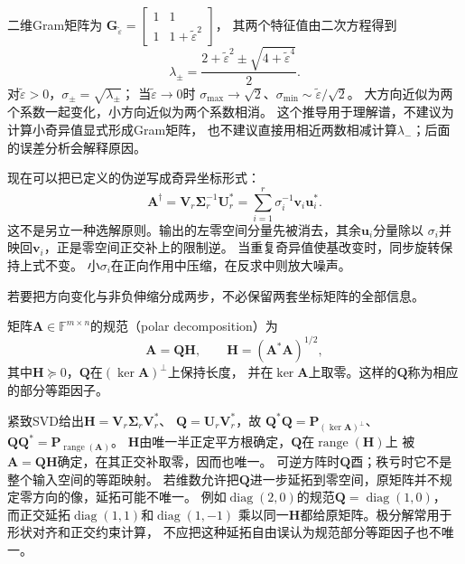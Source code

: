 二维Gram矩阵为
$\bm G_{\widetilde\varepsilon}
=\left[\begin{smallmatrix}1&1\\1&1+\widetilde\varepsilon^2\end{smallmatrix}\right]$，
其两个特征值由二次方程得到
\begin{equation}
 \lambda_\pm
 =\frac{2+\widetilde\varepsilon^2
          \mathbin{\pm}\sqrt{4+\widetilde\varepsilon^4}}{2}.
 \label{eq:matrix-analysis-nearly-collinear-gram-eigenvalues}
\end{equation}
对$\widetilde\varepsilon>0$，$\sigma_\pm=\sqrt{\lambda_\pm}$；
当$\widetilde\varepsilon\to0$时
$\sigma_{\max}\to\sqrt2$、$\sigma_{\min}\sim\widetilde\varepsilon/\sqrt2$。
大方向近似为两个系数一起变化，小方向近似为两个系数相消。
这个推导用于理解谱，不建议为计算小奇异值显式形成Gram矩阵，
也不建议直接用相近两数相减计算$\lambda_-$；后面的误差分析会解释原因。

现在可以把已定义的伪逆写成奇异坐标形式：
\begin{equation}
 \bm A^\dagger
 =\bm V_r\bm\Sigma_r^{-1}\bm U_r^*
 =\sum_{i=1}^r\sigma_i^{-1}\bm v_i\bm u_i^*.
 \label{eq:matrix-analysis-pseudoinverse}
\end{equation}
这不是另立一种选解原则。输出的左零空间分量先被消去，其余$\bm u_i$分量除以
$\sigma_i$并映回$\bm v_i$，正是零空间正交补上的限制逆。
当重复奇异值使基改变时，同步旋转保持上式不变。
小$\sigma_i$在正向作用中压缩，在反求中则放大噪声。

若要把方向变化与非负伸缩分成两步，不必保留两套坐标矩阵的全部信息。
\begin{definition}[极分解与部分等距因子]
\label{def:matrix-analysis-polar-decomposition}
矩阵$\bm A\in\mathbb F^{m\times n}$的规范（polar decomposition）为
\begin{equation}
 \bm A=\bm Q\bm H,\qquad
 \bm H=(\bm A^*\bm A)^{1/2},
 \label{eq:matrix-analysis-polar-decomposition}
\end{equation}
其中$\bm H\succeq0$，$\bm Q$在$(\ker\bm A)^\perp$上保持长度，
并在$\ker\bm A$上取零。这样的$\bm Q$称为相应的部分等距因子。
\end{definition}
紧致SVD给出$\bm H=\bm V_r\bm\Sigma_r\bm V_r^*$、
$\bm Q=\bm U_r\bm V_r^*$，故
$\bm Q^*\bm Q=\bm P_{(\ker\bm A)^\perp}$、
$\bm Q\bm Q^*=\bm P_{\operatorname{range}(\bm A)}$。
$\bm H$由唯一半正定平方根确定，$\bm Q$在$\operatorname{range}(\bm H)$上
被$\bm A=\bm Q\bm H$确定，在其正交补取零，因而也唯一。
可逆方阵时$\bm Q$酉；秩亏时它不是整个输入空间的等距映射。
若维数允许把$\bm Q$进一步延拓到零空间，原矩阵并不规定零方向的像，延拓可能不唯一。
例如$\operatorname{diag}(2,0)$的规范$\bm Q=\operatorname{diag}(1,0)$，
而正交延拓$\operatorname{diag}(1,1)$和$\operatorname{diag}(1,-1)$
乘以同一$\bm H$都给原矩阵。极分解常用于形状对齐和正交约束计算，
不应把这种延拓自由误认为规范部分等距因子也不唯一。

